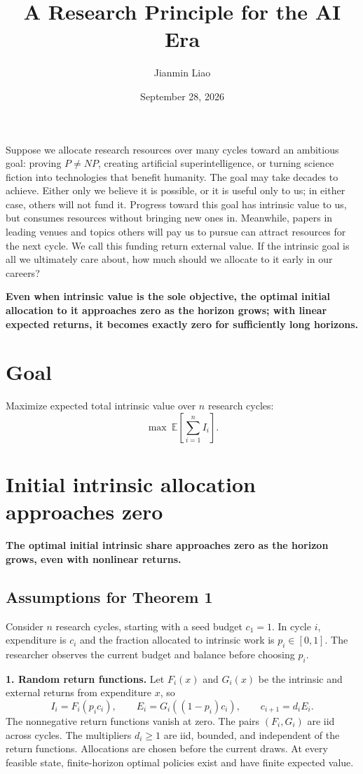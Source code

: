 \documentclass[11pt]{article}
\title{A Research Principle for the AI Era}
\author{Jianmin Liao}
\date{September 28, 2026}
\begin{document}
\maketitle

Suppose we allocate research resources over many cycles toward an ambitious goal: proving $P\ne NP$, creating artificial superintelligence, or turning science fiction into technologies that benefit humanity. The goal may take decades to achieve. Either only we believe it is possible, or it is useful only to us; in either case, others will not fund it. Progress toward this goal has intrinsic value to us, but consumes resources without bringing new ones in. Meanwhile, papers in leading venues and topics others will pay us to pursue can attract resources for the next cycle. We call this funding return external value. If the intrinsic goal is all we ultimately care about, how much should we allocate to it early in our careers?

\textbf{Even when intrinsic value is the sole objective, the optimal initial allocation to it approaches zero as the horizon grows; with linear expected returns, it becomes exactly zero for sufficiently long horizons.}

\section*{Goal}

Maximize expected total intrinsic value over $n$ research cycles:
\[
 \max\ \mathbb E\!\left[\sum_{i=1}^{n}I_i\right].
\]

\section*{Initial intrinsic allocation approaches zero}

\textbf{The optimal initial intrinsic share approaches zero as the horizon grows, even with nonlinear returns.}

\subsection*{Assumptions for Theorem 1}

Consider $n$ research cycles, starting with a seed budget $c_1=1$. In cycle $i$, expenditure is $c_i$ and the fraction allocated to intrinsic work is $p_i\in[0,1]$. The researcher observes the current budget and balance before choosing $p_i$.

\textbf{1. Random return functions.} Let $F_i(x)$ and $G_i(x)$ be the intrinsic and external returns from expenditure $x$, so
\[
 I_i=F_i(p_i c_i),\qquad E_i=G_i((1-p_i)c_i),\qquad c_{i+1}=d_iE_i.
\]
The nonnegative return functions vanish at zero. The pairs $(F_i,G_i)$ are iid across cycles. The multipliers $d_i\ge1$ are iid, bounded, and independent of the return functions. Allocations are chosen before the current draws. At every feasible state, finite-horizon optimal policies exist and have finite expected value.
\end{document}
